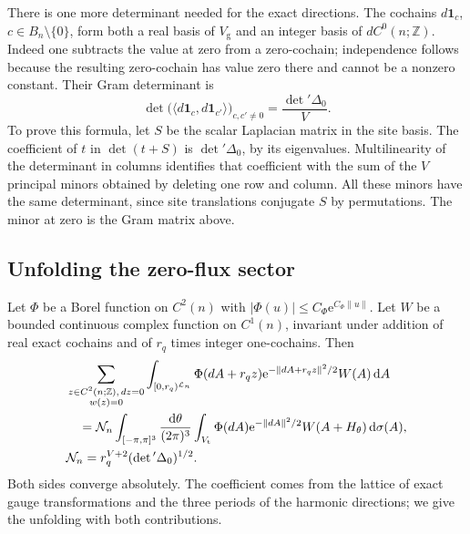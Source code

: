 \documentclass[11pt,letterpaper,reqno]{amsart}
\newcommand{\Z}{\mathbb Z}
\newcommand{\dd}{\mathrm d}
\begin{document}
There is one more determinant needed for the exact directions.
The cochains $d\mathbf1_c$, $c\in B_n\setminus\{0\}$,
form both a real basis of $V_{\mathrm g}$ and an integer
basis of $dC^0(n;\Z)$. Indeed one subtracts the value at
zero from a zero-cochain; independence follows because
the resulting zero-cochain has value zero there and
cannot be a nonzero constant. Their Gram determinant is
\begin{equation}\label{eq:external-exact-Gram}
 \det\big(\langle d\mathbf1_c,d\mathbf1_{c'}\rangle\big)_{c,c'\ne0}
                           =\frac{\det{}'\Delta_0}{V}.
\end{equation}
To prove this formula, let $S$ be the scalar Laplacian matrix
in the site basis. The coefficient of $t$ in $\det(t+S)$
is $\det{}'\Delta_0$, by its eigenvalues. Multilinearity
of the determinant in columns identifies that coefficient
with the sum of the $V$ principal minors obtained by
deleting one row and column. All these minors have the same
determinant, since site translations conjugate $S$ by
permutations. The minor at zero is the Gram matrix above.

\subsection{Unfolding the zero-flux sector}
\label{subsec:external-zero-flux}

Let $\Phi$ be a Borel function on $C^2(n)$ with
$|\Phi(u)|\le C_\Phi \mathrm e^{C_\Phi\|u\|}$.
Let $W$ be a bounded continuous complex function on
$C^1(n)$, invariant under addition of real exact cochains
and of $r_q$ times integer one-cochains. Then
\begin{align}
 &\sum_{\substack{z\in C^2(n;\Z),\,dz=0\\w(z)=0}}
       \int_{[0,r_q)^{\mathcal L_n}}
            \Phi(dA+r_qz)\mathrm e^{-\|dA+r_qz\|^2/2}W(A)\,\dd A
       \notag\\
 &\quad=\mathcal N_n
       \int_{[-\pi,\pi]^3}\frac{\dd\theta}{(2\pi)^3}
       \int_{V_{\mathrm t}}
              \Phi(dA)\mathrm e^{-\|dA\|^2/2}W(A+H_\theta)\,\dd\sigma(A),
                                     \label{eq:external-zero-unfolding}\\
 &\mathcal N_n=r_q^{V+2}(\det{}'\Delta_0)^{1/2}.
                                     \label{eq:external-zero-normalization}
\end{align}
Both sides converge absolutely. The coefficient comes from
the lattice of exact gauge transformations and the three
periods of the harmonic directions; we give the unfolding
with both contributions.
\end{document}
